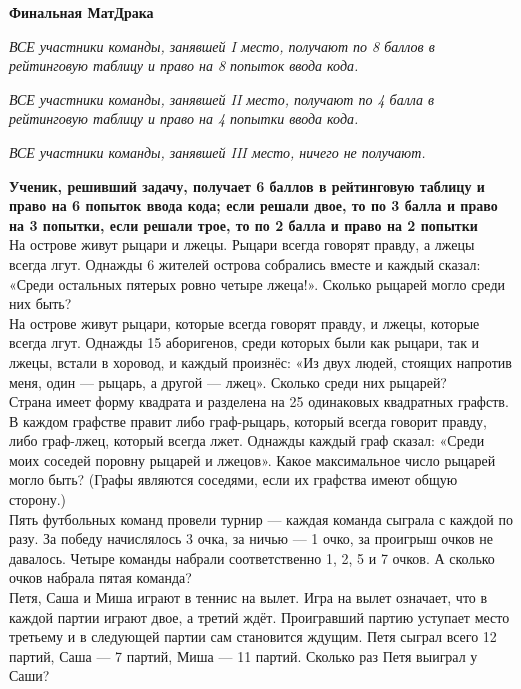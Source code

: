 \centerline{\bf \Huge Финальная МатДрака}

\textit{ВСЕ участники команды, занявшей I место, получают по 8 баллов в рейтинговую таблицу и право на 8 попыток ввода кода.}

\textit{ВСЕ участники команды, занявшей II место, получают по 4 балла в рейтинговую таблицу и право на 4 попытки ввода кода.}

\textit{ВСЕ участники команды, занявшей III место, ничего не получают.}

\textbf{Ученик, решивший задачу, получает 6 баллов в рейтинговую таблицу и право на 6 попыток ввода кода; если решали двое, то по 3 балла и право на 3 попытки, если решали трое, то по 2 балла и право на 2 попытки}\\

 На острове живут рыцари и лжецы. Рыцари всегда говорят правду,
а лжецы всегда лгут. Однажды 6 жителей острова собрались вместе и каждый сказал: «Среди
остальных пятерых ровно четыре лжеца!». Сколько рыцарей могло среди них быть?\\


 На острове живут рыцари, которые всегда говорят правду, и
лжецы, которые всегда лгут. Однажды 15 аборигенов, среди которых были как рыцари, так и
лжецы, встали в хоровод, и каждый произнёс: «Из двух людей, стоящих напротив меня, один —
рыцарь, а другой — лжец». Сколько среди них рыцарей?
\\

 Страна имеет форму квадрата и разделена на 25 одинаковых
квадратных графств. В каждом графстве правит либо граф-рыцарь, который всегда говорит
правду, либо граф-лжец, который всегда лжет. Однажды каждый граф сказал: «Среди моих
соседей поровну рыцарей и лжецов». Какое максимальное число рыцарей могло быть? (Графы
являются соседями, если их графства имеют общую сторону.)\\

 Пять футбольных команд провели турнир — каждая команда сыграла с каждой по разу. За победу начислялось 3 очка, за ничью — 1 очко,
за проигрыш очков не давалось. Четыре команды набрали соответственно 1, 2, 5 и 7 очков.
А сколько очков набрала пятая команда?\\

 Петя, Саша и Миша играют в теннис на вылет. Игра на вылет
означает, что в каждой партии играют двое, а третий ждёт. Проигравший партию уступает
место третьему и в следующей партии сам становится ждущим. Петя сыграл всего 12 партий,
Саша — 7 партий, Миша — 11 партий. Сколько раз Петя выиграл у Саши?\\




